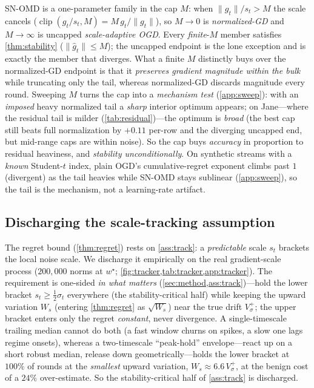 \documentclass{article}
\newcommand{\norm}[1]{\lVert #1 \rVert}
\newcommand{\gt}{g_t}
\newcommand{\clip}{\operatorname{clip}}
\begin{document}
SN-OMD is a one-parameter family in the cap $M$: when $\norm{\gt}/s_t>M$ the scale cancels
($\clip(\gt/s_t,M)=M\,\gt/\norm{\gt}$), so $M\to0$ is \emph{normalized-GD} and $M\to\infty$ is
uncapped \emph{scale-adaptive OGD}. Every \emph{finite}-$M$ member satisfies \cref{thm:stability}
($\norm{\hat g_t}\le M$); the uncapped endpoint is the lone exception and is exactly the member
that diverges. What a finite $M$ distinctly buys over the normalized-GD endpoint is that it
\emph{preserves gradient magnitude within the bulk} while truncating only the tail, whereas
normalized-GD discards magnitude every round. Sweeping $M$ turns the cap into a \emph{mechanism
test} (\cref{app:sweep}): with an \emph{imposed} heavy normalized tail a \emph{sharp} interior
optimum appears; on Jane---where the residual tail is milder (\cref{tab:residual})---the optimum
is \emph{broad} (the best cap still beats full normalization by ${+}0.11$ per-row and the
diverging uncapped end, but mid-range caps are within noise). So the cap buys \emph{accuracy} in
proportion to residual heaviness, and \emph{stability unconditionally}.
On synthetic streams with a \emph{known} Student-$t$ index, plain OGD's cumulative-regret
exponent climbs past $1$ (divergent) as the tail heavies while SN-OMD stays sublinear
(\cref{app:sweep}), so the tail is the mechanism, not a learning-rate artifact.

\subsection{Discharging the scale-tracking assumption}
\label{sec:tracker}

The regret bound (\cref{thm:regret}) rests on \cref{ass:track}: a \emph{predictable} scale
$s_t$ brackets the local noise scale. We discharge it empirically on the real gradient-scale
process ($200{,}000$ norms at $w^\star$; \cref{fig:tracker,tab:tracker,app:tracker}). The
requirement is one-sided \emph{in what matters} (\cref{sec:method,ass:track})---hold the lower
bracket $s_t\ge\tfrac12\sigma_t$ everywhere (the stability-critical half) while keeping the
upward variation $W_s$ (entering \cref{thm:regret} as $\sqrt{W_s}$) near the true drift
$V_\sigma^+$; the upper bracket enters only the regret \emph{constant}, never divergence. A single-timescale
trailing median cannot do both (a fast window churns on spikes, a slow one lags regime
onsets), whereas a two-timescale ``peak-hold'' envelope---react up on a short robust median,
release down geometrically---holds the lower bracket at \emph{$100\%$} of rounds at the
\emph{smallest} upward variation, $W_s\approx6.6\,V_\sigma^+$, at the benign cost of a $24\%$
over-estimate. So the stability-critical half of \cref{ass:track} is discharged.
\end{document}
